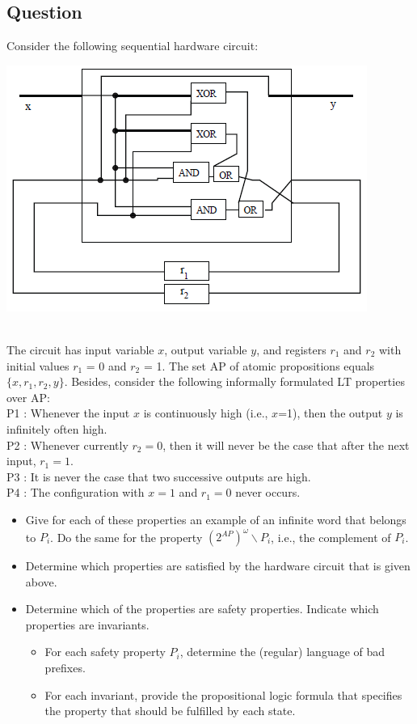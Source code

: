 \documentclass[12pt]{article}
\begin{document}
\subsection*{Question}
Consider the following sequential hardware circuit:\\
\begin{centering}
	\includegraphics[]{ex37.PNG}
\end{centering}\\
The circuit has input variable $x$, output variable $y$, and registers $r_1$ and $r_2$ with initial values
$r_1$ = 0 and $r_2$ = 1. The set AP of atomic propositions equals $\{ x, r_1, r_2, y \}$. Besides, consider the
following informally formulated LT properties over AP:\\
P1 : Whenever the input $x$ is continuously high (i.e., $x$=1), then the output $y$ is infinitely often
high.\\
P2 : Whenever currently $r_2=0$, then it will never be the case that after the next input, $r_1=1$.\\
P3 : It is never the case that two successive outputs are high.\\
P4 : The configuration with $x=1$ and $r_1=0$ never occurs.\\
\begin{itemize}
	\item Give for each of these properties an example of an infinite word that belongs to $P_i$. Do the
	same for the property $(2^{AP})^\omega \backslash P_i $, i.e., the complement of $P_i$.
	\item Determine which properties are satisfied by the hardware circuit that is given above.
	\item Determine which of the properties are safety properties. Indicate which properties are invariants.
	\begin{itemize}
		\item For each safety property $P_i$, determine the (regular) language of bad prefixes.
		\item For each invariant, provide the propositional logic formula that specifies the property
		that should be fulfilled by each state.
	\end{itemize}
\end{itemize}
\end{document}
